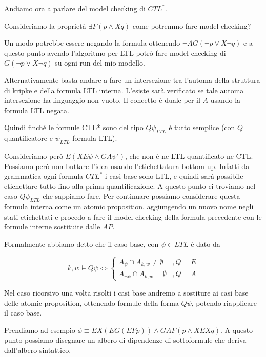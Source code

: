 Andiamo ora a parlare del model checking di \(CTL^*\).

Consideriamo la proprietà \(\exists F(p\land X q)\) come potremmo fare model checking?

Un modo potrebbe essere negando la formula ottenendo \(\neg A G(\neg p \lor X \neg q)\) e a questo punto avendo l'algoritmo per LTL potrò fare model checking di \(G(\neg p \lor X \neg q)\) su ogni run del mio modello.

Alternativamente basta andare a fare un intersezione tra l'automa della struttura di kripke e della formula LTL interna. L'esiste sarà verificato se tale automa intersezione ha linguaggio non vuoto. Il concetto è duale per il \(A\) usando la formula LTL negata.

Quindi finché le formule CTL* sono del tipo \(Q \psi_{LTL}\) è tutto semplice (con \(Q\) quantificatore e \(\psi_{LTL}\) formula LTL\@).

Consideriamo però \(E(X E \psi \land G A \psi')\), che non è ne LTL quantificato ne CTL\@. Possiamo però non buttare l'idea usando l'etichettatura bottom-up. Infatti da grammatica ogni formula \(CTL^*\) i casi base sono LTL\@, e quindi sarà possibile etichettare tutto fino alla prima quantificazione. A questo punto ci troviamo nel caso \(Q \psi_{LTL}\) che sappiamo fare. Per continuare possiamo considerare questa formula interna come un atomic proposition, aggiungendo un nuovo nome negli stati etichettati e procedo a fare il model checking della formula precedente con le formule interne sostituite dalle \(AP\).

Formalmente abbiamo detto che il caso base, con \(\psi \in LTL\) è dato da

\[k,w\models Q\psi \iff \begin{cases}
  A_{\psi} \cap A_{k,w} \neq \emptyset & ,Q = E \\
  A_{\neg \psi} \cap A_{k,w} = \emptyset & ,Q = A
\end{cases}\]

Nel caso ricorsivo una volta risolti i casi base andremo a sostiture ai casi base delle atomic proposition, ottenendo formule della forma \(Q\psi\), potendo riapplicare il caso base.

Prendiamo ad esempio \(\phi \equiv EX(EG(EFp)) \land GAF(p\land XEXq)\). A questo punto possiamo disegnare un albero di dipendenze di sottoformule che deriva dall'albero sintattico.

\begin{center}
\end{center}

